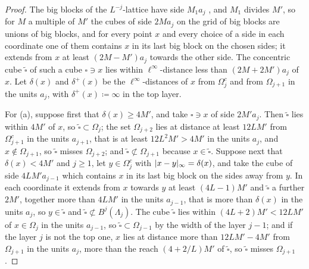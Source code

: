 \documentclass[11pt]{preprint}
\DeclarePairedDelimiter{\abs}{\lvert}{\rvert}
\numberwithin{equation}{section}
\theoremstyle{definition}
\theoremstyle{remark}
\theoremstyle{plain}
\begin{document}
\begin{proof}
The big blocks of the $L^{-j}$-lattice have side $M_1a_j$ \cite[p.~277, l.~12]{BalabanVAR}, and $M_1$ divides $M'$, so for $M$ a multiple of $M'$ the cubes of side $2Ma_j$ on the grid of big blocks are unions of big blocks, and for every point $x$ and every choice of a side in each coordinate one of them contains $x$ in its last big block on the chosen sides; it extends from $x$ at least $(2M - M')a_j$ towards the other side. The concentric cube $\tilde\square$ of such a cube $\square \ni x$ lies within $\ell^\infty$-distance less than $(2M + 2M')a_j$ of $x$. Let $\delta(x)$ and $\delta^+(x)$ be the $\ell^\infty$-distances of $x$ from $\Omega_j^c$ and from $\Omega_{j+1}$ in the units $a_j$, with $\delta^+(x) \coloneqq \infty$ in the top layer.

For (a), suppose first that $\delta(x) \geq 4M'$, and take $\square \ni x$ of side $2M'a_j$. Then $\tilde\square$ lies within $4M'$ of $x$, so $\tilde\square \subset \Omega_j$; the set $\Omega_{j+2}$ lies at distance at least $12LM'$ from $\Omega_{j+1}^c$ in the units $a_{j+1}$, that is at least $12L^2M' > 4M'$ in the units $a_j$, and $x \notin \Omega_{j+1}$, so $\tilde\square$ misses $\Omega_{j+2}$; and $\tilde\square \not\subset \Omega_{j+1}$ because $x \in \tilde\square$. Suppose next that $\delta(x) < 4M'$ and $j \geq 1$, let $y \in \Omega_j^c$ with $\abs{x - y}_\infty = \delta(x)$, and take the cube of side $4LM'a_{j-1}$ which contains $x$ in its last big block on the sides away from $y$. In each coordinate it extends from $x$ towards $y$ at least $(4L - 1)M'$ and $\tilde\square$ a further $2M'$, together more than $4LM'$ in the units $a_{j-1}$, that is more than $\delta(x)$ in the units $a_j$, so $y \in \tilde\square$ and $\tilde\square \not\subset B^j(\Lambda_j)$. The cube $\tilde\square$ lies within $(4L + 2)M' < 12LM'$ of $x \in \Omega_j$ in the units $a_{j-1}$, so $\tilde\square \subset \Omega_{j-1}$ by the width of the layer $j - 1$; and if the layer $j$ is not the top one, $x$ lies at distance more than $12LM' - 4M'$ from $\Omega_{j+1}$ in the units $a_j$, more than the reach $(4 + 2/L)M'$ of $\tilde\square$, so $\tilde\square$ misses $\Omega_{j+1}$.


\end{proof}
\end{document}
